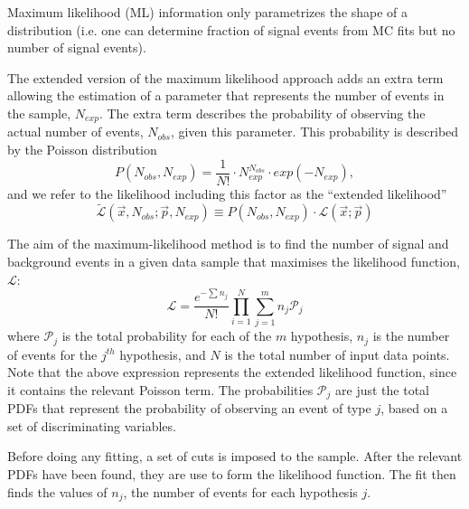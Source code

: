 Maximum likelihood (ML) information only parametrizes the shape of a 
distribution (i.e. one can determine fraction of signal events from 
MC fits but no number of signal events).


The extended version of the maximum likelihood approach adds an extra term
allowing the estimation of %
a parameter that represents the number of events in the sample, $N_{exp}$.
The extra term describes the probability of observing the actual number of events, $N_{obs}$, given this parameter. This probability is described by the Poisson distribution
%
\begin{equation}
P(N_{obs},N_{exp}) = \frac{1}{N!} \cdot N_{exp}^{N_{obs}} \cdot exp(-N_{exp}),
\end{equation}
%
and we refer to the likelihood including this factor as the ``extended likelihood''
%
\begin{equation}
\tilde{\mathcal{L}}(\vec{x},N_{obs};\vec{p},N_{exp}) \equiv P(N_{obs},N_{exp}) \cdot \mathcal{L}(\vec{x};\vec{p})
\end{equation}
%

The aim of the maximum-likelihood method is to find the number of signal and background events in a given data sample that maximises the likelihood function, $\mathcal{L}$:
%
\begin{equation}
\mathcal{L} =  \frac{e^{-\sum n_j}}{N!} \prod^N_{i=1}\sum^m_{j=1} n_j  \mathcal{P}_j
\end{equation}
%
where $\mathcal{P}_j$ is the total probability for each of the $m$ hypothesis, $n_j$ is the number of events for the $j^{th}$ hypothesis, and $N$ is the total number of input data points. Note that the above expression represents the extended likelihood function, since it contains the relevant Poisson term.  The probabilities $\mathcal{P}_j$ are just the total PDFs that represent the probability of observing an event of type $j$, based on a set of discriminating variables. 

Before doing any fitting, a set of cuts is imposed to the sample.  After the relevant PDFs have been found, they are use to form the likelihood function.  The fit then finds the values of $n_j$, the number of events for each hypothesis $j$.



